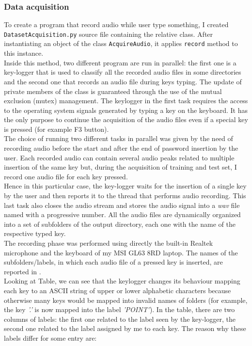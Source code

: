 \subsubsection{Data acquisition}
To create a program that record audio while user type something, I created \texttt{DatasetAcquisition.py} source file containing the relative class. After instantiating an object of the class \texttt{AcquireAudio}, it applies \texttt{record} method to this instance.\\
Inside this method, two different program are run in parallel: the first one is a key-logger that is used to classify all the recorded audio files in some directories and the second one that records an audio file during keys typing. The update of private members of the class is guaranteed through the use of the mutual exclusion (mutex) management. The keylogger in the first task requires the access to the operating system signals generated by typing a key on the keyboard. It has the only purpose to continue the acquisition of the audio files even if a special key is pressed (for example F3 button).\\
The choice of running two different tasks in parallel was given by the need of recording audio before the start and after the end of password insertion by the user. Each recorded audio can contain several audio peaks related to multiple insertion of the same key but, during the acquisition of training and test set, I record one audio file for each key pressed.\\
Hence in this particular case, the key-logger waits for the insertion of a single key by the user and then reports it to the thread that performs audio recording. This last task also closes the audio stream and stores the audio signal into a \textit{wav} file named with a progressive number. All the audio files are dynamically organized into a set of subfolders of the output directory, each one with the name of the respective typed key.\\
The recording phase was performed using directly the built-in Realtek microphone and the keyboard of my MSI GL63 8RD laptop. The names of the subfolders/labels, in which each audio file of a pressed key is inserted, are reported in .\\
Looking at Table, we can see that the keylogger changes its behaviour mapping each key to an ASCII string of upper or lower alphabetic characters because otherwise many keys would be mapped into invalid names of folders (for example, the key \textit{'.'} is now mapped into the label \textit{'POINT'}). In the table, there are two columns of labels: the first one related to the label seen by the key-logger, the second one related to the label assigned by me to each key. The reason why these labels differ for some entry are:
